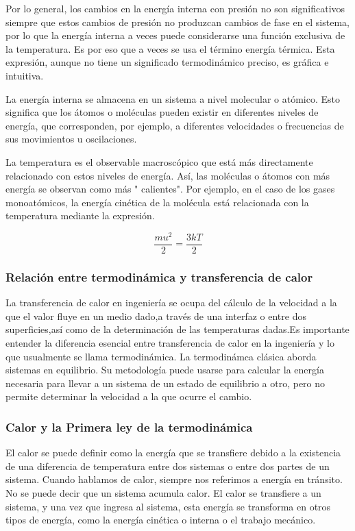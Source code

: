 \documentclass[12pt,letterpaper]{article}     %
\begin{document}
Por lo general, los cambios en la energía interna con presión no son significativos siempre que estos cambios de presión no produzcan cambios de fase en el sistema, por lo que la energía interna a veces puede considerarse una función exclusiva de la temperatura. Es por eso que a veces se usa el término energía térmica. Esta expresión, aunque no tiene un significado termodinámico preciso, es gráfica e intuitiva.

La energía interna se almacena en un sistema a nivel molecular o atómico. Esto significa que los átomos o moléculas pueden existir en diferentes niveles de energía, que corresponden, por ejemplo, a diferentes velocidades o frecuencias de sus movimientos u oscilaciones.

La temperatura es el observable macroscópico que está más directamente relacionado con estos niveles de energía. Así, las moléculas o átomos con más energía se observan como más " calientes". Por ejemplo, en el caso de los gases monoatómicos, la energía cinética de la molécula está relacionada con la temperatura mediante la expresión.\cite[p.2-3]{Eduardo} 

\begin{equation}
   \frac {mu^2 }{2} =\frac {3kT }{2}  
    \label{eq:temperature.internalenergy}
\end{equation}

\subsubsection{Relación entre termodinámica y transferencia de calor}

\cite[p\ 4]{Mills} La transferencia de calor en ingeniería se ocupa del cálculo de la velocidad a la que el valor fluye en un medio dado,a través de una interfaz o entre dos superficies,así como de la determinación de las temperaturas dadas.Es importante entender la diferencia esencial entre transferencia de calor en la ingeniería y lo que usualmente se llama termodinámica. La termodinámca clásica aborda sistemas en equilibrio. Su metodología puede usarse para calcular la energía necesaria para llevar a un sistema de un estado de equilibrio a otro, pero no permite determinar la velocidad a la que ocurre el cambio.

\subsubsection{Calor y la Primera ley de la termodinámica}

 \cite[p\ 2-2]{Eduardo} El calor se puede definir como la energía que se transfiere debido a la existencia de una diferencia de temperatura entre dos sistemas o entre dos partes de un sistema. Cuando hablamos de calor, siempre nos referimos a energía en tránsito. No se puede decir que un sistema acumula calor. El calor se transfiere a un sistema, y una vez que ingresa al sistema, esta energía se transforma en otros tipos de energía, como la energía cinética o interna o el trabajo mecánico.
\end{document}

